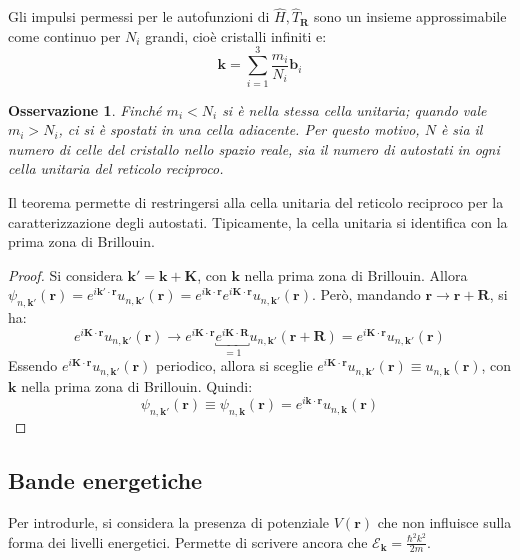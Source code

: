 \documentclass[10pt, a4paper]{scrartcl}
\numberwithin{equation}{subsection}
\theoremstyle{style1}
\newtheorem{osservazione}{Osservazione}[section]
\begin{document}
Gli impulsi permessi per le autofunzioni di $\hat{H}, \hat{T}_\mathbf{R} $ sono un insieme approssimabile come continuo per $N_i$ grandi, cio\`e cristalli infiniti e:
\begin{equation}
	\mathbf{k} = \sum_{i=1}^{3} \frac{m_i}{N_i} \mathbf{b} _i
\end{equation}
\begin{osservazione}
	Finch\'e $m_i < N_i$ si \`e nella stessa cella unitaria; quando vale $m_i > N_i$, ci si \`e spostati in una cella adiacente. Per questo motivo, $N$ \`e sia il numero di celle del cristallo nello spazio reale, sia il numero di autostati in ogni cella unitaria del reticolo reciproco.
\end{osservazione}
Il teorema permette di restringersi alla cella unitaria del reticolo reciproco per la caratterizzazione degli autostati. Tipicamente, la cella unitaria si identifica con la prima zona di Brillouin.
\begin{proof}
	Si considera $\mathbf{k} ' = \mathbf{k} + \mathbf{K} $, con $\mathbf{k} $ nella prima zona di Brillouin. Allora $\psi _{n, \mathbf{k}' } (\mathbf{r} ) = e^{ i \mathbf{k} ' \cdot \mathbf{r} } u_{n, \mathbf{k} '} (\mathbf{r} )=e^{i \mathbf{k} \cdot \mathbf{r} } e^{i \mathbf{K} \cdot \mathbf{r} } u_{n ,\mathbf{k} '} (\mathbf{r} ) $. Per\`o, mandando $\mathbf{r} \to \mathbf{r } + \mathbf{R} $, si ha:
	\[
		e^{i \mathbf{K} \cdot \mathbf{r} } u_{n,\mathbf{k} '} (\mathbf{r} )\to e^{i \mathbf{K} \cdot \mathbf{r} } \underbracket{e^{i \mathbf{K} \cdot \mathbf{R} }}_{=1}  u_{n,\mathbf{k} '} (\mathbf{r} +\mathbf{R}) = e^{i \mathbf{K} \cdot \mathbf{r} } u_{n,\mathbf{k} '} (\mathbf{r} )
	\] 
	Essendo $e^{i \mathbf{K} \cdot \mathbf{r} } u_{n,\mathbf{k} '} (\mathbf{r} )$ periodico, allora si sceglie $e^{i\mathbf{K} \cdot \mathbf{r} } u_{n,\mathbf{k} '} (\mathbf{r} ) \equiv u_{n,\mathbf{k} } (\mathbf{r} )$, con $\mathbf{k} $ nella prima zona di Brillouin. Quindi:
	\begin{equation}
		\psi _{n, \mathbf{k}' }(\mathbf{r} ) \equiv \psi _{n,\mathbf{k} }(\mathbf{r} ) = e^{i \mathbf{k} \cdot \mathbf{r} } u_{n,\mathbf{k} } (\mathbf{r} )
	\end{equation}
\end{proof}
\subsection{Bande energetiche}
Per introdurle, si considera la presenza di potenziale $V(\mathbf{r} )$ che non influisce sulla forma dei livelli energetici. Permette di scrivere ancora che $\mathscr{E}_\mathbf{k}  = \frac{\hbar ^2 k^2}{2m}$.
\end{document}
